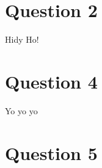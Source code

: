\documentclass[pdftex,10pt,a4paper]{article}
\begin{document}
\finalexam

\part*{Question 2}

Hidy Ho!

\newpage
\part*{Question 4}

Yo yo yo

\newpage
\part*{Question 5}
\end{document}
